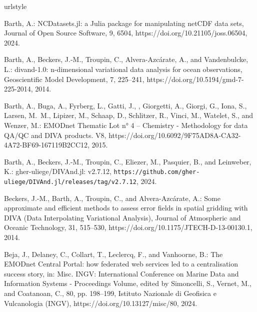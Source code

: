 \documentclass[essd,manuscript]{copernicus}
\begin{document}
\begin{thebibliography}{52}
\providecommand{\natexlab}[1]{#1}
\providecommand{\url}[1]{\texttt{#1}}
\providecommand{\urlprefix}{}
\expandafter\ifx\csname urlstyle\endcsname\relax
  \providecommand{\doi}[1]{https://doi.org/\discretionary{}{}{}#1}\else
  \providecommand{\doi}{https://doi.org/\discretionary{}{}{}\begingroup
  \urlstyle{rm}\Url}\fi

Barth, A.: NCDatasets.jl: a Julia package for manipulating netCDF data sets,
  Journal of Open Source Software, 9, 6504, \doi{10.21105/joss.06504}, 2024.

Barth, A., Beckers, J.-M., Troupin, C., Alvera-Azc\'arate, A., and
  Vandenbulcke, L.: divand-1.0: n-dimensional variational data analysis for
  ocean observations, Geoscientific Model Development, 7, 225--241,
  \doi{10.5194/gmd-7-225-2014}, 2014.

Barth, A., Buga, A., Fyrberg, L., Gatti, J., , Giorgetti, A., Giorgi, G., Iona,
  S., Larsen, M.~M., Lipizer, M., Schaap, D., Schlitzer, R., Vinci, M.,
  Watelet, S., and Wenzer, M.: EMODnet Thematic Lot n° 4 – Chemistry -
  Methodology for data QA/QC and DIVA products. V8,
  \doi{10.6092/9F75AD8A-CA32-4A72-BF69-167119B2CC12}, 2015.

Barth, A., Beckers, J.-M., Troupin, C., Eliezer, M., Pasquier, B., and
  Leinweber, K.: gher-uliege/DIVAnd.jl: v2.7.12,
  \urlprefix\url{https://github.com/gher-uliege/DIVAnd.jl/releases/tag/v2.7.12},
  2024.

Beckers, J.-M., Barth, A., Troupin, C., and Alvera-Azc\'{a}rate, A.: {Some
  approximate and efficient methods to assess error fields in spatial gridding
  with DIVA (Data Interpolating Variational Analysis)}, Journal of Atmospheric
  and Oceanic Technology, 31, 515--530, \doi{10.1175/JTECH-D-13-00130.1}, 2014.

Beja, J., Delaney, C., Collart, T., Leclercq, F., and Vanhoorne, B.: {The
  EMODnet Central Portal: how federated web services led to a centralisation
  success story}, in: {Misc. INGV: International Conference on Marine Data and
  Information Systems - Proceedings Volume}, edited by Simoncelli, S., Vernet,
  M., and Coatanoan, C., 80, pp. 198--199, Istituto Nazionale di Geofisica e
  Vulcanologia (INGV), \doi{10.13127/misc/80}, 2024.


\end{thebibliography}
\end{document}

